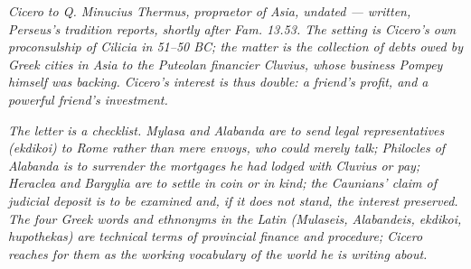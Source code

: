 
\textit{Cicero to Q. Minucius Thermus, propraetor of Asia,
undated --- written, Perseus's tradition reports, shortly
after \textit{Fam.} 13.53. The setting is Cicero's own
proconsulship of Cilicia in 51--50 BC; the matter is the
collection of debts owed by Greek cities in Asia to the
Puteolan financier Cluvius, whose business Pompey himself
was backing. Cicero's interest is thus double: a friend's
profit, and a powerful friend's investment.}

\textit{The letter is a checklist. Mylasa and Alabanda are
to send legal representatives \textit{(ekdikoi)} to Rome
rather than mere envoys, who could merely talk; Philocles of
Alabanda is to surrender the mortgages he had lodged with
Cluvius or pay; Heraclea and Bargylia are to settle in coin
or in kind; the Caunians' claim of judicial deposit is to be
examined and, if it does not stand, the interest preserved.
The four Greek words and ethnonyms in the Latin
(\textit{Mulaseis}, \textit{Alabandeis}, \textit{ekdikoi},
\textit{hupothekas}) are technical terms of provincial
finance and procedure; Cicero reaches for them as the
working vocabulary of the world he is writing about.}
